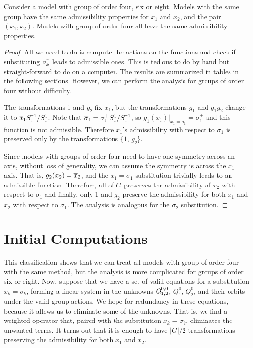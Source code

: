 \begin{prop} Consider a \classic \twoD model with group of order four, six or eight. Models with the same group have the same admissibility properties for $x_1$ and $x_2$, and the pair $(x_1,x_2)$. Models with group of order four all have the same admissibility properties.
\end{prop}
\begin{proof} All we need to do is compute the actions on the functions and check if substituting $\sigma_k^{\um}$ leads to admissible ones. This is tedious to do by hand but straight-forward to do on a computer. The results are summarized in tables in the following sections. However, we can perform the analysis for groups of order four without difficulty. 

The transformations 1 and $g_2$ fix $x_1$, but the transformations $g_1$ and $g_1g_2$ change it to $\ol x_1 S_1^{\um 1}/S_1^1$. Note that $\ol \sigma_1 = \sigma_1^+ S_1^1/S_1^{\um 1}$, so $g_1(x_1)|_{x_1 = \sigma_1} = \sigma_1^+ $ and this function is not admissible. Therefore $x_1$'s admissibility with respect to $\sigma_1$ is preserved only by the transformations $\{1$, $g_2\}$.

Since models with groups of order four need to have one symmetry across an axis, without loss of generality, we can assume the symmetry is across the $x_1$ axis. That is, $g_2(x_2) = \overline{x}_2$, and the $x_1 = \sigma_1$ substitution trivially leads to an admissible function. Therefore, all of $G$ preserves the admissibility of $x_2$ with respect to $\sigma_1$ and finally, only 1 and $g_2$ preserve the admissibility for both $x_1$ and $x_2$ with respect to $\sigma_1$. The analysis is analogous for the $\sigma_2$ substitution.
\end{proof}

\section{Initial Computations}

This classification shows that we can treat all models with group of order four with the same method, but the analysis is more complicated for groups of order six or eight. Now, suppose that we have a set of valid equations for a substitution $x_k = \sigma_k$, forming a linear system in the unknowns $Q_{1,2}^{0,0}$, $Q_1^0$, $Q_2^0$, and their orbits under the valid group actions. We hope for redundancy in these equations, because it allows us to eliminate some of the unknowns. That is, we find a weighted operator that, paired with the substitution $x_k = \sigma_k$, eliminates the unwanted terms. It turns out that it is enough to have $|G|/2$ transformations preserving the admissibility for both $x_1$ and $x_2$.

